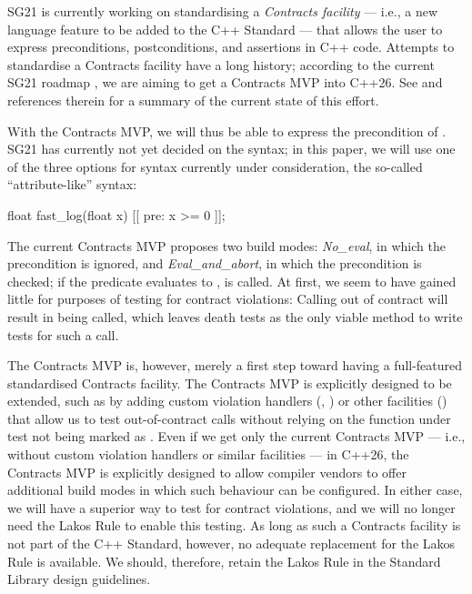 SG21 is currently working on standardising a \emph{Contracts facility} --- i.e., a new language feature to be added to the C++ Standard --- that allows the user to express preconditions, postconditions, and assertions in C++ code. Attempts to standardise a Contracts facility have a long history; according to the current SG21 roadmap \cite{P2695R1}, we are aiming to get a Contracts MVP into C++26. See \cite{P2521R3} and references therein for a summary of the current state of this effort.

With the Contracts MVP, we will thus be able to express the precondition of . SG21 has currently not yet decided on the syntax; in this paper, we will use one of the three options for syntax currently under consideration, the so-called ``attribute-like'' syntax:
\begin{codeblock}
float fast_log(float x) [[ pre: x >= 0 ]];
\end{codeblock}

The current Contracts MVP proposes two build modes: \emph{No_eval}, in which the precondition is ignored, and \emph{Eval_and_abort}, in which the precondition is checked; if the predicate evaluates to ,  is called. At first, we seem to have gained little for purposes of testing for contract violations: Calling  out of contract will result in  being called, which leaves death tests as the only viable method to write tests for such a call.

The Contracts MVP is, however, merely a first step toward having a full-featured standardised Contracts facility. The Contracts MVP is explicitly designed to be extended, such as by adding custom violation handlers (\cite{P2698R0}, \cite{P2811R0}) or other facilities (\cite{P2784R0}) that allow us to test out-of-contract calls without relying on the function under test not being marked as . Even if we get only the current Contracts MVP --- i.e., without custom violation handlers or similar facilities --- in C++26, the Contracts MVP is explicitly designed to allow compiler vendors to offer additional build modes in which such behaviour can be configured. In either case, we will have a superior way to test for contract violations, and we will no longer need the Lakos Rule to enable this testing. As long as such a Contracts facility is not part of the C++ Standard, however, no adequate replacement for the Lakos Rule is available. We should, therefore, retain the Lakos Rule in the Standard Library design guidelines.

